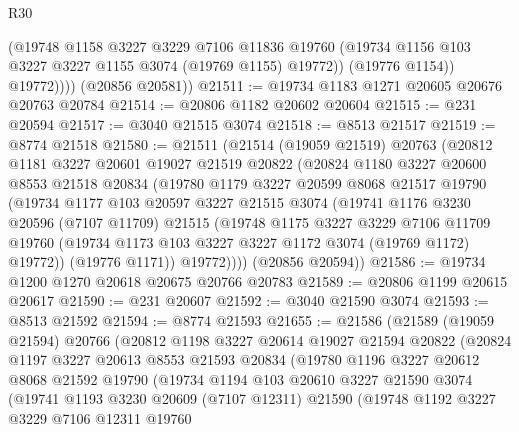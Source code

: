 \begin{lexlean}{R30}
\begin{coremodule}
                (@19748
                  @1158
                  @3227
                  @3229
                  @7106
                  @11836
                  @19760
                  (@19734 @1156 @103 @3227 @3227 @1155 @3074 (@19769 @1155) @19772))
                (@19776 @1154))
              @19772))))
      (@20856 @20581))
@21511 := @19734 @1183 @1271 @20605 @20676 @20763 @20784
@21514 := @20806 @1182 @20602 @20604
@21515 := @231 @20594
@21517 := @3040 @21515 @3074
@21518 := @8513 @21517
@21519 := @8774 @21518
@21580 := @21511
    (@21514
      (@19059 @21519)
      @20763
      (@20812
        @1181
        @3227
        @20601
        @19027
        @21519
        @20822
        (@20824
          @1180
          @3227
          @20600
          @8553
          @21518
          @20834
          (@19780
            @1179
            @3227
            @20599
            @8068
            @21517
            @19790
            (@19734
              @1177
              @103
              @20597
              @3227
              @21515
              @3074
              (@19741
                @1176
                @3230
                @20596
                (@7107 @11709)
                @21515
                (@19748
                  @1175
                  @3227
                  @3229
                  @7106
                  @11709
                  @19760
                  (@19734 @1173 @103 @3227 @3227 @1172 @3074 (@19769 @1172) @19772))
                (@19776 @1171))
              @19772))))
      (@20856 @20594))
@21586 := @19734 @1200 @1270 @20618 @20675 @20766 @20783
@21589 := @20806 @1199 @20615 @20617
@21590 := @231 @20607
@21592 := @3040 @21590 @3074
@21593 := @8513 @21592
@21594 := @8774 @21593
@21655 := @21586
    (@21589
      (@19059 @21594)
      @20766
      (@20812
        @1198
        @3227
        @20614
        @19027
        @21594
        @20822
        (@20824
          @1197
          @3227
          @20613
          @8553
          @21593
          @20834
          (@19780
            @1196
            @3227
            @20612
            @8068
            @21592
            @19790
            (@19734
              @1194
              @103
              @20610
              @3227
              @21590
              @3074
              (@19741
                @1193
                @3230
                @20609
                (@7107 @12311)
                @21590
                (@19748
                  @1192
                  @3227
                  @3229
                  @7106
                  @12311
                  @19760

\end{coremodule}
\end{lexlean}
